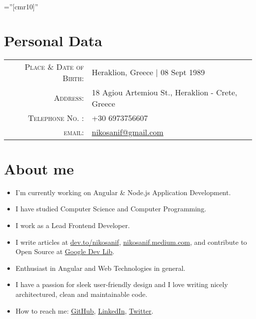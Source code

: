 \documentclass[11pt]{article}
\begin{document}

\font\fb=''[cmr10]'' 

\par{\par}
\par{\par}
\bigskip

\section{Personal Data}

\begin{tabular}{rl}
    \textsc{Place \& Date of Birth:}    & Heraklion, Greece | 08 Sept 1989 \\
    \textsc{Address:}                   & 18 Agiou Artemiou St., Heraklion - Crete, Greece \\
    \textsc{Telephone No. :}            & +30 6973756607 \\
    \textsc{email:}                     & \href{mailto:nikosanif@gmail.com}{nikosanif@gmail.com} \\
\end{tabular}

\section{About me}

\footnotesize{
    \begin{itemize}
        \item I'm currently working on Angular \& Node.js Application Development.
        \item I have studied Computer Science and Computer Programming.
        \item I work as a Lead Frontend Developer.
        \item I write articles at 
            \href{https://dev.to/nikosanif}{dev.to/nikosanif},
            \href{https://nikosanif.medium.com/}{nikosanif.medium.com},
            and contribute to Open Source at \href{https://devlibrary.withgoogle.com/authors/nikosanif}{Google Dev Lib}.
        \item Enthusiast in Angular and Web Technologies in general.
        \item I have a passion for sleek user-friendly design and I love writing nicely architectured, clean and maintainable code.
        \item How to reach me: 
            \href{https://github.com/nikosanif}{GitHub},
            \href{https://www.linkedin.com/in/nikosanifantis/}{LinkedIn},
            \href{https://twitter.com/nikosanif}{Twitter}.
    \end{itemize}
}
\end{document}
